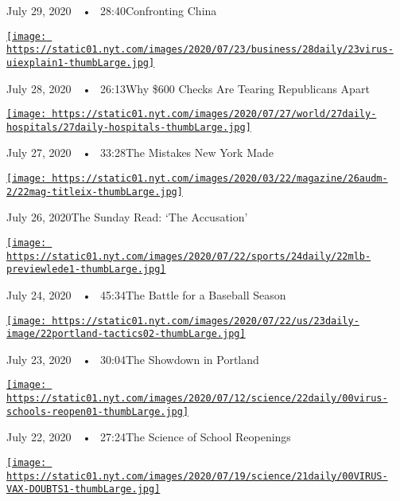July 29, 2020~~•~ 28:40Confronting China

\href{https://www.nytimes.com/2020/07/28/podcasts/the-daily/unemployment-benefits-coronavirus.html?action=click\&module=audio-series-bar\&region=header\&pgtype=Article}{\texttt{[image: https://static01.nyt.com/images/2020/07/23/business/28daily/23virus-uiexplain1-thumbLarge.jpg]}}

July 28, 2020~~•~ 26:13Why \$600 Checks Are Tearing Republicans Apart

\href{https://www.nytimes.com/2020/07/27/podcasts/the-daily/new-york-hospitals-covid.html?action=click\&module=audio-series-bar\&region=header\&pgtype=Article}{\texttt{[image: https://static01.nyt.com/images/2020/07/27/world/27daily-hospitals/27daily-hospitals-thumbLarge.jpg]}}

July 27, 2020~~•~ 33:28The Mistakes New York Made

\href{https://www.nytimes.com/2020/07/26/podcasts/the-daily/the-accusation-the-sunday-read.html?action=click\&module=audio-series-bar\&region=header\&pgtype=Article}{\texttt{[image: https://static01.nyt.com/images/2020/03/22/magazine/26audm-2/22mag-titleix-thumbLarge.jpg]}}

July 26, 2020The Sunday Read: `The Accusation'

\href{https://www.nytimes.com/2020/07/24/podcasts/the-daily/mlb-baseball-season-coronavirus.html?action=click\&module=audio-series-bar\&region=header\&pgtype=Article}{\texttt{[image: https://static01.nyt.com/images/2020/07/22/sports/24daily/22mlb-previewlede1-thumbLarge.jpg]}}

July 24, 2020~~•~ 45:34The Battle for a Baseball Season

\href{https://www.nytimes.com/2020/07/23/podcasts/the-daily/portland-protests.html?action=click\&module=audio-series-bar\&region=header\&pgtype=Article}{\texttt{[image: https://static01.nyt.com/images/2020/07/22/us/23daily-image/22portland-tactics02-thumbLarge.jpg]}}

July 23, 2020~~•~ 30:04The Showdown in Portland

\href{https://www.nytimes.com/2020/07/22/podcasts/the-daily/school-reopenings-coronavirus.html?action=click\&module=audio-series-bar\&region=header\&pgtype=Article}{\texttt{[image: https://static01.nyt.com/images/2020/07/12/science/22daily/00virus-schools-reopen01-thumbLarge.jpg]}}

July 22, 2020~~•~ 27:24The Science of School Reopenings

\href{https://www.nytimes.com/2020/07/21/podcasts/the-daily/coronavirus-vaccine.html?action=click\&module=audio-series-bar\&region=header\&pgtype=Article}{\texttt{[image: https://static01.nyt.com/images/2020/07/19/science/21daily/00VIRUS-VAX-DOUBTS1-thumbLarge.jpg]}}

